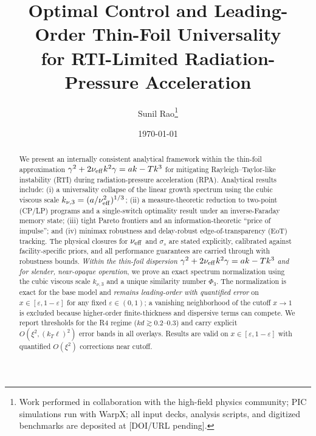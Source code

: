 \documentclass[aps,pre,twocolumn,showpacs,superscriptaddress]{revtex4-2}
\theoremstyle{definition}
\begin{document}
\title{Optimal Control and Leading-Order Thin-Foil Universality\\
for RTI-Limited Radiation-Pressure Acceleration}

\author{Sunil Rao\footnote{Work performed in collaboration with the high-field physics community; PIC simulations run with WarpX; all input decks, analysis scripts, and digitized benchmarks are deposited at [DOI/URL pending].}}

\date{\today}

\begin{abstract}
We present an internally consistent analytical framework within the thin-foil approximation
$\gamma^2+2\nu_{\rm eff}k^2\gamma=ak-Tk^3$ for mitigating Rayleigh--Taylor-like instability (RTI) during
radiation-pressure acceleration (RPA). Analytical results include: (i) a universality collapse of the linear growth
spectrum using the cubic viscous scale $k_{\nu,3}=(a/\nu_{\rm eff}^2)^{1/3}$; (ii) a measure-theoretic reduction to
two-point (CP/LP) programs and a single-switch optimality result under an inverse-Faraday memory state;
(iii) tight Pareto frontiers and an information-theoretic ``price of impulse''; and (iv) minimax robustness and
delay-robust edge-of-transparency (EoT) tracking. The physical closures for $\nu_{\rm eff}$ and $\sigma_s$ are stated
explicitly, calibrated against facility-specific priors, and all performance guarantees are carried through
with robustness bounds. \emph{Within the thin-foil dispersion} $\gamma^2+2\nu_{\rm eff}k^2\gamma=ak-Tk^3$ \emph{and for slender, near-opaque operation}, we prove an exact spectrum normalization using the cubic viscous scale $k_{\nu,3}$ and a unique similarity number $\Phi_3$. The normalization is exact for the base model and \emph{remains leading-order with quantified error} on $x\in[\varepsilon,1-\varepsilon]$ for any fixed $\varepsilon\in(0,1)$; a vanishing neighborhood of the cutoff $x\to1$ is excluded because higher-order finite-thickness and dispersive terms can compete. We report thresholds for the R4 regime ($kd\gtrsim0.2$–0.3) and carry explicit $O(\xi^2,(k_T\ell)^2)$ error bands in all overlays. Results are valid on $x\in[\varepsilon,1-\varepsilon]$ with quantified $O(\xi^2)$ corrections near cutoff.
\end{abstract}

\end{document}
